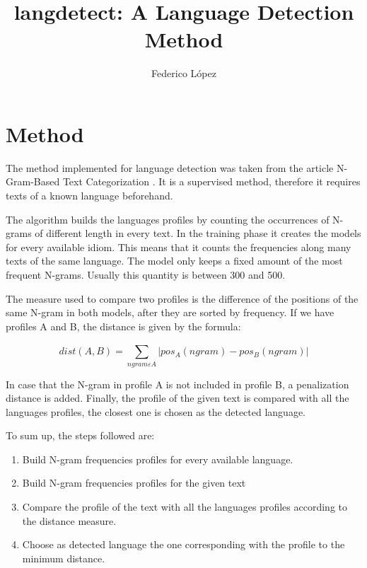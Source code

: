\documentclass{llncs}
\begin{document}
\frontmatter

\title{langdetect: A Language Detection Method}

\author{Federico López}

\maketitle

\section{Method}
The method implemented for language detection was taken from the article N-Gram-Based Text Categorization \cite{n-gram-basedtext}. It is a supervised method, therefore it requires texts of a known language beforehand.

The algorithm builds the languages profiles by counting the occurrences of N-grams of different length in every text. In the training phase it creates the models for every available idiom. This means that it counts the frequencies along many texts of the same language. The model only keeps a fixed amount of the most frequent N-grams. Usually this quantity is between 300 and 500. 

The measure used to compare two profiles is the difference of the positions of the same N-gram in both models, after they are sorted by frequency. If we have profiles A and B, the distance is given by the formula:

\begin{equation}
dist(A,B) = \sum_{ngram \varepsilon A}^{} | pos_{A}(ngram) - pos_{B}(ngram) | 
\end{equation}

In case that the N-gram in profile A is not included in profile B, a penalization distance is added.
Finally, the profile of the given text is compared with all the languages profiles, the closest one is chosen as the detected language.

To sum up, the steps followed are:
\begin{enumerate}
	\item Build N-gram frequencies profiles for every available language.
	\item Build N-gram frequencies profiles for the given text
	\item Compare the profile of the text with all the languages profiles according to the distance measure.
	\item Choose as detected language the one corresponding with the profile to the minimum distance.
\end{enumerate}
\end{document}
